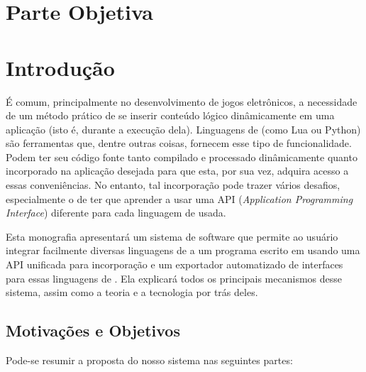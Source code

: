 \chapter*{Parte Objetiva}
\label{sec:parte_objetiva}
\chapter{Introdução}
\label{sec:intr}

É comum, principalmente no desenvolvimento de jogos eletrônicos, a necessidade
de um método prático de se inserir conteúdo lógico dinâmicamente em uma
aplicação (isto é, durante a execução dela). Linguagens de \script{} (como Lua ou
Python) são ferramentas que, dentre outras coisas, fornecem esse tipo de
funcionalidade. Podem ter seu código fonte tanto compilado e processado
dinâmicamente quanto incorporado na aplicação desejada para que esta, por sua
vez, adquira acesso a essas conveniências. No entanto, tal incorporação pode
trazer vários desafios, especialmente o de ter que aprender a usar uma API
(\textit{Application Programming Interface}) diferente para cada linguagem de \script{}
usada.

Esta monografia apresentará um sistema de software que permite ao usuário
integrar facilmente diversas linguagens de \script{} a um programa escrito em
\CXX{} usando uma API unificada para incorporação e um exportador
automatizado de interfaces \CXX{} para essas linguagens de \script{}. Ela
explicará todos os principais mecanismos desse sistema, assim como a teoria e a
tecnologia por trás deles.

\section{Motivações e Objetivos}
\label{sec:intr:motivacoes_objetivos}

Pode-se resumir a proposta do nosso sistema nas seguintes partes:

